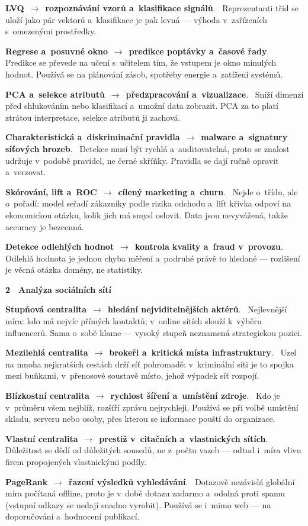 \documentclass[11pt,a4paper]{article}
\newcommand{\blok}[2]{\par\addvspace{2.4mm}\noindent
  \textcolor{blokcol}{\textbf{#1}}\ \ \textbf{#2}\par\nobreak}
\newcommand{\apl}[2]{\par\addvspace{1.5mm}\noindent
  \textbf{#1}\ \textcolor{defframe}{$\rightarrow$}\ \textbf{#2}.\ \ignorespaces}
\begin{document}
\apl{LVQ}{rozpoznávání vzorů a~klasifikace signálů}
Reprezentanti tříd se uloží jako pár vektorů a~klasifikace je pak levná --- výhoda
v~zařízeních s~omezenými prostředky.

\apl{Regrese a~posuvné okno}{predikce poptávky a~časové řady}
Predikce se převede na učení s~učitelem tím, že vstupem je okno minulých hodnot. Používá se
na plánování zásob, spotřeby energie a~zatížení systémů.

\apl{PCA a~selekce atributů}{předzpracování a~vizualizace}
Sníží dimenzi před shlukováním nebo klasifikací a~umožní data zobrazit. PCA za to platí
ztrátou interpretace, selekce atributů ji zachová.

\apl{Charakteristická a~diskriminační pravidla}{malware a~signatury síťových hrozeb}
Detekce musí být rychlá a~auditovatelná, proto se znalost udržuje v~podobě pravidel, ne
černé skříňky. Pravidla se dají ručně opravit a~verzovat.

\apl{Skórování, lift a~ROC}{cílený marketing a~churn}
Nejde o~třídu, ale o~pořadí: model seřadí zákazníky podle rizika odchodu a~lift křivka
odpoví na ekonomickou otázku, kolik jich má smysl oslovit. Data jsou nevyvážená, takže
accuracy je bezcenná.

\apl{Detekce odlehlých hodnot}{kontrola kvality a~fraud v~provozu}
Odlehlá hodnota je jednou chyba měření a~podruhé právě to hledané --- rozlišení je věcná
otázka domény, ne statistiky.

\blok{2}{Analýza sociálních sítí}

\apl{Stupňová centralita}{hledání nejviditelnějších aktérů}
Nejlevnější míra: kdo má nejvíc přímých kontaktů; v~online sítích slouží k~výběru
influencerů. Sama o~sobě klame --- vysoký stupeň neznamená strategickou pozici.

\apl{Mezilehlá centralita}{brokeři a~kritická místa infrastruktury}
Uzel na mnoha nejkratších cestách drží síť pohromadě: v~kriminální síti je to spojka mezi
buňkami, v~přenosové soustavě místo, jehož výpadek síť rozpojí.

\apl{Blízkostní centralita}{rychlost šíření a~umístění zdroje}
Kdo je v~průměru všem nejblíž, rozšíří zprávu nejrychleji. Používá se při volbě umístění
skladu, serveru nebo osoby, přes kterou se informace pouští do organizace.

\apl{Vlastní centralita}{prestiž v~citačních a~vlastnických sítích}
Důležitost se dědí od důležitých sousedů, ne z~počtu vazeb --- odtud i~míra vlivu firem
propojených vlastnickými podíly.

\apl{PageRank}{řazení výsledků vyhledávání}
Dotazově nezávislá globální míra počítaná offline, proto je v~době dotazu zadarmo a~odolná
proti spamu (vstupní odkazy se nedají snadno vyrobit). Používá se i~mimo web ---
na doporučování a~hodnocení publikací.
\end{document}
